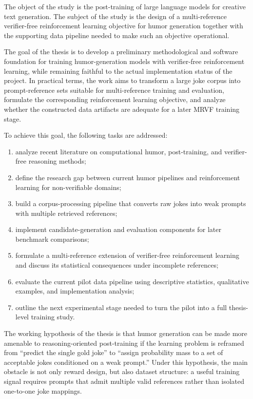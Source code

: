 \documentclass[14pt,a4paper]{extreport}
\begin{document}
The object of the study is the post-training of large language models for creative text generation. The subject of the study is the design of a multi-reference verifier-free reinforcement learning objective for humor generation together with the supporting data pipeline needed to make such an objective operational.

The goal of the thesis is to develop a preliminary methodological and software foundation for training humor-generation models with verifier-free reinforcement learning, while remaining faithful to the actual implementation status of the project. In practical terms, the work aims to transform a large joke corpus into prompt-reference sets suitable for multi-reference training and evaluation, formulate the corresponding reinforcement learning objective, and analyze whether the constructed data artifacts are adequate for a later MRVF training stage.

To achieve this goal, the following tasks are addressed:
\begin{enumerate}
  \item analyze recent literature on computational humor, post-training, and verifier-free reasoning methods;
  \item define the research gap between current humor pipelines and reinforcement learning for non-verifiable domains;
  \item build a corpus-processing pipeline that converts raw jokes into weak prompts with multiple retrieved references;
  \item implement candidate-generation and evaluation components for later benchmark comparisons;
  \item formulate a multi-reference extension of verifier-free reinforcement learning and discuss its statistical consequences under incomplete references;
  \item evaluate the current pilot data pipeline using descriptive statistics, qualitative examples, and implementation analysis;
  \item outline the next experimental stage needed to turn the pilot into a full thesis-level training study.
\end{enumerate}

The working hypothesis of the thesis is that humor generation can be made more amenable to reasoning-oriented post-training if the learning problem is reframed from ``predict the single gold joke'' to ``assign probability mass to a set of acceptable jokes conditioned on a weak prompt.'' Under this hypothesis, the main obstacle is not only reward design, but also dataset structure: a useful training signal requires prompts that admit multiple valid references rather than isolated one-to-one joke mappings.
\end{document}
